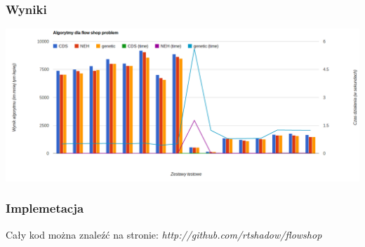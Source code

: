 \documentclass{beamer}
\begin{document}
\begin{frame}
    \frametitle{Wyniki}
    \includegraphics[scale=0.24]{chart.png}
\end{frame}

\begin{frame}
    \frametitle{Implemetacja}
        Cały kod można znaleźć na stronie: \textit{http://github.com/rtshadow/flowshop}
\end{frame}
\end{document}
